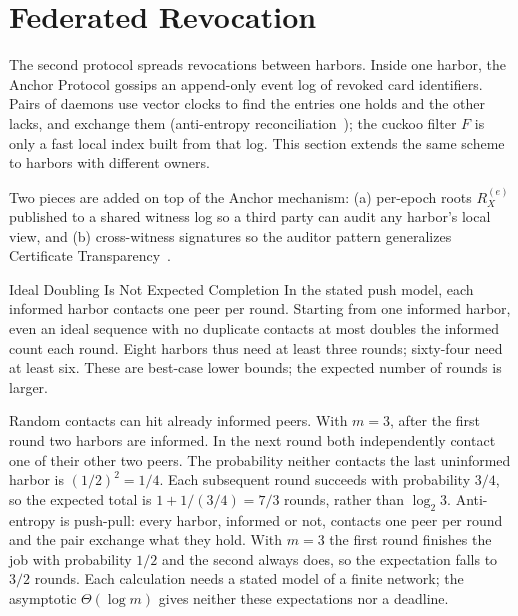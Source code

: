\documentclass[11pt,a4paper]{article}
\theoremstyle{definition}
\theoremstyle{remark}
\begin{document}
\section{Federated Revocation}\label{sec:fh-revocation}

The second protocol spreads revocations between harbors. Inside one harbor, the Anchor Protocol gossips an append-only event log of revoked card identifiers. Pairs of daemons use vector clocks to find the entries one holds and the other lacks, and exchange them (anti-entropy reconciliation~); the cuckoo filter $F$ is only a fast local index built from that log. This section extends the same scheme to harbors with different owners.

Two pieces are added on top of the Anchor mechanism: (a) per-epoch roots $R_X^{(e)}$ published to a shared witness log so a third party can audit any harbor's local view, and (b) cross-witness signatures so the auditor pattern generalizes Certificate Transparency~.



\begin{pdexample}{Ideal Doubling Is Not Expected Completion}
In the stated push model, each informed harbor contacts one peer per round.
Starting from one informed harbor, even an ideal sequence with no duplicate
contacts at most doubles the informed count each round. Eight harbors thus
need at least three rounds; sixty-four need at least six. These are best-case
lower bounds; the expected number of rounds is larger.

Random contacts can hit already informed peers. With $m=3$, after the first
round two harbors are informed. In the next round both independently contact
one of their other two peers. The probability neither contacts the last
uninformed harbor is $(1/2)^2=1/4$. Each subsequent round succeeds with
probability $3/4$, so the expected total is $1+1/(3/4)=7/3$ rounds, rather
than $\log_2 3$. Anti-entropy is push-pull: every harbor, informed or not,
contacts one peer per round and the pair exchange what they hold. With $m=3$
the first round finishes the job with probability $1/2$ and the second always
does, so the expectation falls to $3/2$ rounds. Each calculation needs a stated
model of a finite network; the asymptotic $\Theta(\log m)$ gives neither these
expectations nor a deadline.
\end{pdexample}
\end{document}
